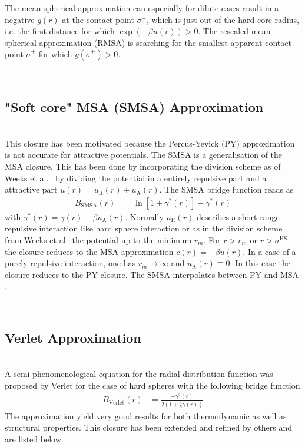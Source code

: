 The mean spherical approximation can especially for dilute cases result in a negative $g(r)$ at the contact point $\sigma^+$, which is just out of the hard core radius, i.e. the first distance for which $\exp(-\beta u(r)) >0$. The rescaled mean spherical approximation (RMSA) \cite{Hansen1982} is searching for the smallest apparent contact point $\tilde{\sigma}^+$ for which  $g\left(\tilde{\sigma}^+\right) > 0$.

\vphantom{.}~\\
\subsection{"Soft core" MSA (SMSA) Approximation}
\label{sec:SMSA}~\\

This closure has been motivated because the Percus-Yevick (PY) approximation is not accurate for attractive
potentials. The SMSA \cite{Madden1980,Chihara1973} is a generalisation of the MSA closure. This has been
done by incorporating the division scheme as of Weeks et al.\ \cite{Weeks1971} by dividing the potential
in a entirely repulsive part and a attractive part $u(r) = u_\text{R}(r)+u_\text{A}(r)$. The SMSA bridge function reads as
\begin{align}
B_\text{SMSA}(r) &= \ln \left[1+\gamma^*(r)\right]-\gamma^*(r)
\end{align}
with $\gamma^*(r)=\gamma(r)-\beta u_\text{A}(r)$.
Normally  $u_\text{R}(r)$ describes a short range repulsive interaction like hard sphere interaction or as in the
division scheme from Weeks et al.\ the potential up to the minimum $r_m$. For $r>r_m$ or $r > \sigma^\text{HS}$ the
closure reduces to the MSA approximation $c(r)=-\beta u(r)$. In a case of a purely repulsive interaction, one has
$r_m\rightarrow \infty$ and $u_\text{A}(r) \equiv 0$. In this case the closure reduces to the PY closure.
The SMSA interpolates between PY and MSA \cite{Bomont2008}.

\vphantom{.}~\\
\subsection{Verlet Approximation}
\label{sec:Verlet}~\\

A semi-phenomenological equation for the radial distribution function was proposed by Verlet
\cite{Verlet1980,Verlet1981} for the case of hard spheres with the following bridge function
\begin{align} \label{eq:ozVerlet}
B_\text{Verlet}(r)
&=\frac{-\gamma^2(r)}{2\left(1+\frac{4}{5}\gamma(r)\right)}
\end{align}
The approximation yield very good results for both thermodynamic as well as structural properties.
This closure has been extended and refined by others and are listed below.


